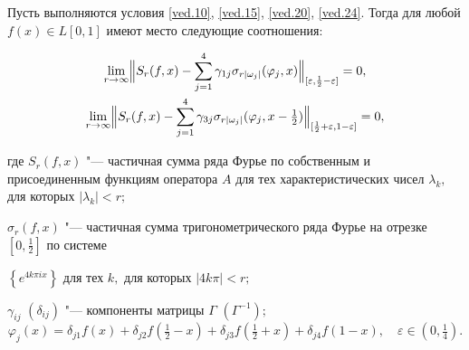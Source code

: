 \begin{theorem}[5]Пусть выполняются условия {\rm  \eqref{ved.10}, \eqref{ved.15}, \eqref{ved.20}, \eqref{ved.24}. } Тогда для любой $f(x)\in L[0,1]$ имеют место следующие соотношения{\rm\/:}

\begin{gather}

\lim_{r \to \infty} \Bigl\| S_r(f,x)-\sum_{j=1}^4 \gamma_{1j} \sigma_{r|\omega_j|}(\varphi_j,x)\Bigr\|_{[\varepsilon,\frac{1}{2}-\varepsilon]}=0,

\\

\lim_{r \to \infty} \Bigl\| S_r(f,x)-\sum_{j=1}^4 \gamma_{3j} \sigma_{r|\omega_j|}

(\varphi_j,x-\tfrac{1}{2})\Bigr\|_{[\frac{1}{2}+\varepsilon,1-\varepsilon]}=0,

\end{gather}

где $S_r(f,x)$ "--- частичная сумма ряда Фурье по собственным и присоединенным функциям оператора $A$ для тех характеристических чисел $\lambda_k,$ для  которых $|\lambda_k|<r;$ 

$\sigma_r(f,x)$ "--- частичная сумма тригонометрического ряда Фурье на отрезке $[0,\frac{1}{2}]$ по системе 

$\left\{e^{4k\pi ix}\right\}$ для тех $k,$ для которых $|{4k\pi|<r};$ 

$\gamma_{ij}$ $(\delta_{ij})$ "--- компоненты матрицы $\Gamma$ $(\Gamma^{-1});$ $$\varphi_j(x)=\delta_{j1}f(x)+\delta_{j2}f(\tfrac{1}{2}-x)+\delta_{j3}f(\tfrac{1}{2}+x)+\delta_{j4}f(1-x),\quad \varepsilon\in (0,\tfrac{1}{4}).$$

\end{theorem}



\smallskip



